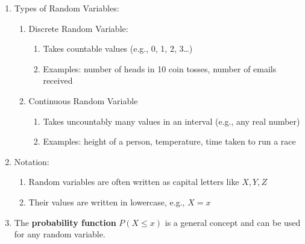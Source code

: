 \begin{enumerate}
    \item Types of Random Variables:
    \hfill \cite{common/online/chatgpt}
    \begin{enumerate}
        \item Discrete Random Variable:
        \hfill \cite{common/online/chatgpt}
        \begin{enumerate}
            \item Takes countable values (e.g., 0, 1, 2, 3…)
            \hfill \cite{common/online/chatgpt}
            
            \item Examples: number of heads in 10 coin tosses, number of emails received
            \hfill \cite{common/online/chatgpt}
        \end{enumerate}

        \item Continuous Random Variable
        \hfill \cite{common/online/chatgpt}
        \begin{enumerate}
            \item Takes uncountably many values in an interval (e.g., any real number)
            \hfill \cite{common/online/chatgpt}
            
            \item Examples: height of a person, temperature, time taken to run a race
            \hfill \cite{common/online/chatgpt}
        \end{enumerate}
    \end{enumerate}

    \item Notation:
    \begin{enumerate}
        \item Random variables are often written as capital letters like $X, Y, Z$
        \hfill \cite{common/online/chatgpt}

        \item Their values are written in lowercase, e.g., $X=x$
        \hfill \cite{common/online/chatgpt}
    \end{enumerate}

    \item The \textbf{probability function} $P(X \leq x)$ is a general concept and can be used for any random variable. 
    \hfill \cite{statistics/book/Statistics-for-Data-Scientists/Maurits-Kaptein}
    
\end{enumerate}



